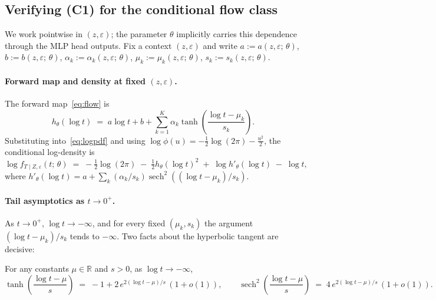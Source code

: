 \subsection{Verifying (C1) for the conditional flow class}
\label{app:c1}

We work pointwise in $(z, \varepsilon)$; the parameter $\theta$
implicitly carries this dependence through the MLP head outputs. Fix a
context $(z, \varepsilon)$ and write
$a := a(z, \varepsilon;\, \theta)$,
$b := b(z, \varepsilon;\, \theta)$,
$\alpha_k := \alpha_k(z, \varepsilon;\, \theta)$,
$\mu_k := \mu_k(z, \varepsilon;\, \theta)$,
$s_k := s_k(z, \varepsilon;\, \theta)$.

\paragraph{Forward map and density at fixed $(z, \varepsilon)$.}
The forward map~\eqref{eq:flow} is
\[
    h_\theta(\log t)
    \;=\; a \log t + b + \sum_{k=1}^{K} \alpha_k \tanh\!\left(\frac{\log t - \mu_k}{s_k}\right).
\]
Substituting into~\eqref{eq:logpdf} and using
$\log \phi(u) = -\frac{1}{2} \log(2\pi) - \frac{u^2}{2}$, the conditional
log-density is
\begin{equation}
    \log f_{T \mid Z, \varepsilon}(t;\, \theta)
    \;=\; -\tfrac{1}{2} \log(2\pi)
        \;-\; \tfrac{1}{2} h_\theta(\log t)^2
        \;+\; \log h'_\theta(\log t)
        \;-\; \log t,
    \label{eq:app-logpdf}
\end{equation}
where $h'_\theta(\log t) = a + \sum_k (\alpha_k / s_k) \operatorname{sech}^2((\log t - \mu_k)/s_k)$.

\paragraph{Tail asymptotics as $t \to 0^+$.}
As $t \to 0^+$, $\log t \to -\infty$, and for every fixed
$(\mu_k, s_k)$ the argument $(\log t - \mu_k)/s_k$ tends to $-\infty$.
Two facts about the hyperbolic tangent are decisive:

\begin{lemma}
\label{lem:tanh}
For any constants $\mu \in \mathbb{R}$ and $s > 0$, as $\log t \to -\infty$,
\[
    \tanh\!\left(\frac{\log t - \mu}{s}\right) \;=\; -1 + 2\,e^{2 (\log t - \mu)/s}\,(1 + o(1)),
    \qquad
    \operatorname{sech}^2\!\left(\frac{\log t - \mu}{s}\right) \;=\; 4\,e^{2 (\log t - \mu)/s}\,(1 + o(1)).
\]
\end{lemma}

